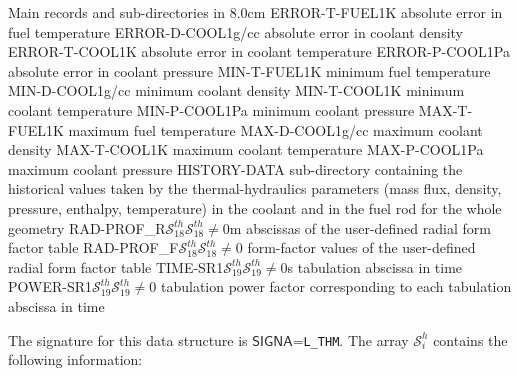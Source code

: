 \begin{DescriptionEnregistrement}{Main records and sub-directories in }{8.0cm}
\RealEnr
  {ERROR-T-FUEL}{1}{K}
  {absolute error in fuel temperature}
\RealEnr
  {ERROR-D-COOL}{1}{g/cc}
  {absolute error in coolant density}
\RealEnr
  {ERROR-T-COOL}{1}{K}
  {absolute error in coolant temperature}
\RealEnr
  {ERROR-P-COOL}{1}{Pa}
  {absolute error in coolant pressure}
\RealEnr
  {MIN-T-FUEL}{1}{K}
  {minimum fuel temperature}
\RealEnr
  {MIN-D-COOL}{1}{g/cc}
  {minimum coolant density}
\RealEnr
  {MIN-T-COOL}{1}{K}
  {minimum coolant temperature}
\RealEnr
  {MIN-P-COOL}{1}{Pa}
  {minimum coolant pressure}
\RealEnr
  {MAX-T-FUEL}{1}{K}
  {maximum fuel temperature}
\RealEnr
  {MAX-D-COOL}{1}{g/cc}
  {maximum coolant density}
\RealEnr
  {MAX-T-COOL}{1}{K}
  {maximum coolant temperature}
\RealEnr
  {MAX-P-COOL}{1}{Pa}
  {maximum coolant pressure}
 \DirEnr
  {HISTORY-DATA}
  {sub-directory containing the historical values taken by the thermal-hydraulics parameters (mass flux, density, pressure, enthalpy, temperature)
  in the coolant and in the fuel rod for the whole geometry}
\OptRealEnr
  {RAD-PROF\_R}{$\mathcal{S}^{th}_{18}$}{$\mathcal{S}^{th}_{18}\ne 0$}{m}
  {abscissas of the user-defined radial form factor table}
\OptRealEnr
  {RAD-PROF\_F}{$\mathcal{S}^{th}_{18}$}{$\mathcal{S}^{th}_{18}\ne 0$}{ }
  {form-factor values of the user-defined radial form factor table}
\OptRealEnr
  {TIME-SR1}{$\mathcal{S}^{th}_{19}$}{$\mathcal{S}^{th}_{19}\ne 0$}{s}
  {tabulation abscissa in time}
\OptRealEnr
  {POWER-SR1}{$\mathcal{S}^{th}_{19}$}{$\mathcal{S}^{th}_{19}\ne 0$}{ }
  {tabulation power factor corresponding to each tabulation abscissa in time}
\end{DescriptionEnregistrement}

The signature for this data structure is $\mathsf{SIGNA}$=\verb*|L_THM|. The array $\mathcal{S}^{h}_{i}$
contains the following information: 

